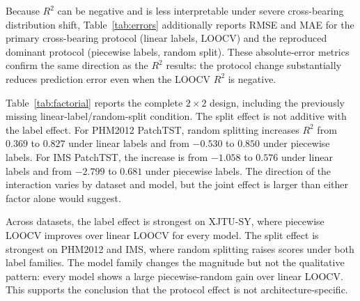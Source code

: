 \documentclass[5p,twocolumn]{elsarticle}
\begin{document}
Because $R^2$ can be negative and is less interpretable under severe cross-bearing distribution shift, Table~\ref{tab:errors} additionally reports RMSE and MAE for the primary cross-bearing protocol (linear labels, LOOCV) and the reproduced dominant protocol (piecewise labels, random split). These absolute-error metrics confirm the same direction as the $R^2$ results: the protocol change substantially reduces prediction error even when the LOOCV $R^2$ is negative.

Table~\ref{tab:factorial} reports the complete $2 \times 2$ design, including the previously missing linear-label/random-split condition. The split effect is not additive with the label effect. For PHM2012 PatchTST, random splitting increases $R^2$ from $0.369$ to $0.827$ under linear labels and from $-0.530$ to $0.850$ under piecewise labels. For IMS PatchTST, the increase is from $-1.058$ to $0.576$ under linear labels and from $-2.799$ to $0.681$ under piecewise labels. The direction of the interaction varies by dataset and model, but the joint effect is larger than either factor alone would suggest.

Across datasets, the label effect is strongest on XJTU-SY, where piecewise LOOCV improves over linear LOOCV for every model. The split effect is strongest on PHM2012 and IMS, where random splitting raises scores under both label families. The model family changes the magnitude but not the qualitative pattern: every model shows a large piecewise-random gain over linear LOOCV. This supports the conclusion that the protocol effect is not architecture-specific.
\end{document}
